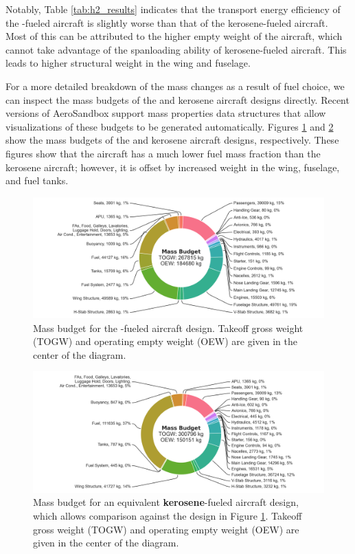 Notably, Table \ref{tab:h2_results} indicates that the transport energy efficiency of the \lh-fueled aircraft is slightly worse than that of the kerosene-fueled aircraft. Most of this can be attributed to the higher empty weight of the \lh aircraft, which cannot take advantage of the spanloading ability of kerosene-fueled aircraft. This leads to higher structural weight in the wing and fuselage.

For a more detailed breakdown of the mass changes as a result of fuel choice, we can inspect the mass budgets of the \lh and kerosene aircraft designs directly. Recent versions of AeroSandbox support mass properties data structures that allow visualizations of these budgets to be generated automatically. Figures \ref{fig:h2_mass_budget} and \ref{fig:kerosene_mass_budget} show the mass budgets of the \lh and kerosene aircraft designs, respectively. These figures show that the \lh aircraft has a much lower fuel mass fraction than the kerosene aircraft; however, it is offset by increased weight in the wing, fuselage, and fuel tanks.

\begin{figure}[H]
    \centering
    \includegraphics[width=\textwidth, trim={3in 0 3in 0}]{../figures/Hydrogen/ppt/media/image27.png}
    \caption{Mass budget for the \textbf{\lh}-fueled aircraft design. Takeoff gross weight (TOGW) and operating empty weight (OEW) are given in the center of the diagram.}
    \label{fig:h2_mass_budget}
\end{figure}

\begin{figure}[H]
    \centering
    \includegraphics[width=\textwidth, trim={3in 0 3in 0}]{../figures/Hydrogen/ppt/media/image26.png}
    \caption{Mass budget for an equivalent \textbf{kerosene}-fueled aircraft design, which allows comparison against the \lh design in Figure \ref{fig:h2_mass_budget}. Takeoff gross weight (TOGW) and operating empty weight (OEW) are given in the center of the diagram.}
    \label{fig:kerosene_mass_budget}
\end{figure}

